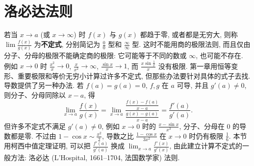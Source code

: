 \documentclass[UTF8,openany]{ctexbook}
\theoremstyle{chinesetextbook}
\begin{document}
\section{洛必达法则}
若当 $x\to a$ (或 $x\to\infty$) 时 $f(x)$ 与 $g(x)$ 都趋于零, 或者都是无穷大, 则称 $\displaystyle\lim\frac{f(x)}{g(x)}$ 为\textbf{不定式}, 分别简记为 $\displaystyle\frac00$ 型和 $\displaystyle\frac\infty\infty$ 型. 这时不能用商的极限法则, 而且仅由分子、分母的极限不能确定商的极限: 它可能等于不同的数或 $\infty$, 也可能不存在. 例如 $x\to0$ 时 $\displaystyle\frac{x^2}x\to0$, $\displaystyle\frac x{x^2}\to\infty$, $\displaystyle\frac{\sin x}x\to1$, 而 $\displaystyle\frac{x\sin\frac1x}x$ 没有极限. 第一章用恒等变形、重要极限和等价无穷小计算过许多不定式, 但那些办法要针对具体的式子去找. 导数提供了另一种办法. 若 $f(a)=g(a)=0$, $f,g$ 在 $a$ 可导, 并且 $g'(a)\ne0$, 则分子、分母同除以 $x-a$, 得
\[
\lim_{x\to a}\frac{f(x)}{g(x)}=\lim_{x\to a}\frac{\frac{f(x)-f(a)}{x-a}}{\frac{g(x)-g(a)}{x-a}}=\frac{f'(a)}{g'(a)}.
\]
但许多不定式不满足 $g'(a)\ne0$, 例如 $x\to0$ 时的 $\displaystyle\frac{x-\sin x}{x^3}$, 分子、分母在 $0$ 的导数都是零. 不过由 $\displaystyle1-\cos x\sim\frac{x^2}2$, 导数之比 $\displaystyle\frac{1-\cos x}{3x^2}$ 在 $x\to0$ 时仍有极限 $\displaystyle\frac16$. 本节用柯西中值定理证明, 可以把 $\displaystyle\frac{f'(a)}{g'(a)}$ 换成 $\displaystyle\lim_{x\to a}\frac{f'(x)}{g'(x)}$, 由此建立计算不定式的一般方法: 洛必达 (L'Hospital, 1661--1704, 法国数学家) 法则.
\end{document}
